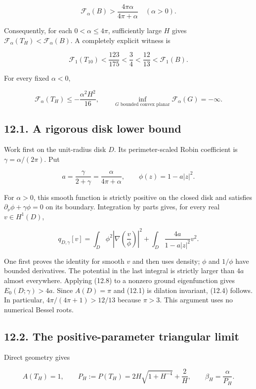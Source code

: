 \documentclass[11pt]{article}
\begin{document}
\[
\mathcal F_\alpha(B)>\frac{4\pi\alpha}{4\pi+\alpha}
\quad(\alpha>0).
\tag{12.4}
\]

Consequently, for each \(0<\alpha\le4\pi\), sufficiently large \(H\)
gives \(\mathcal F_\alpha(T_H)<\mathcal F_\alpha(B)\). A completely
explicit witness is

\[
\mathcal F_1(T_{10})<\frac{123}{175}<\frac34
<\frac{12}{13}<\mathcal F_1(B).
\tag{12.5}
\]

For every fixed \(\alpha<0\),

\[
\mathcal F_\alpha(T_H)\le-\frac{\alpha^2H^2}{16},
\qquad
\inf_{G\text{ bounded convex planar}}\mathcal F_\alpha(G)=-\infty.
\tag{12.6}
\]

\subsection{12.1. A rigorous disk lower
bound}\label{a-rigorous-disk-lower-bound}

Work first on the unit-radius disk \(D\). Its perimeter-scaled Robin
coefficient is \(\gamma=\alpha/(2\pi)\). Put

\[
a=\frac\gamma{2+\gamma}=\frac\alpha{4\pi+\alpha},
\qquad \phi(z)=1-a|z|^2.
\tag{12.7}
\]

For \(\alpha>0\), this smooth function is strictly positive on the
closed disk and satisfies \(\partial_\nu\phi+\gamma\phi=0\) on its
boundary. Integration by parts gives, for every real \(v\in H^1(D)\),

\[
q_{D,\gamma}[v]
=\int_D\phi^2\left|\nabla\!\left(\frac v\phi\right)\right|^2
+\int_D\frac{4a}{1-a|z|^2}v^2.
\tag{12.8}
\]

One first proves the identity for smooth \(v\) and then uses density;
\(\phi\) and \(1/\phi\) have bounded derivatives. The potential in the
last integral is strictly larger than \(4a\) almost everywhere. Applying
(12.8) to a nonzero ground eigenfunction gives \(E_0(D;\gamma)>4a\).
Since \(A(D)=\pi\) and (12.1) is dilation invariant, (12.4) follows. In
particular, \(4\pi/(4\pi+1)>12/13\) because \(\pi>3\). This argument
uses no numerical Bessel roots.

\subsection{12.2. The positive-parameter triangular
limit}\label{the-positive-parameter-triangular-limit}

Direct geometry gives

\[
A(T_H)=1,\qquad
P_H:=P(T_H)=2H\sqrt{1+H^{-4}}+\frac2H,
\qquad \beta_H=\frac\alpha{P_H}.
\tag{12.9}
\]
\end{document}
